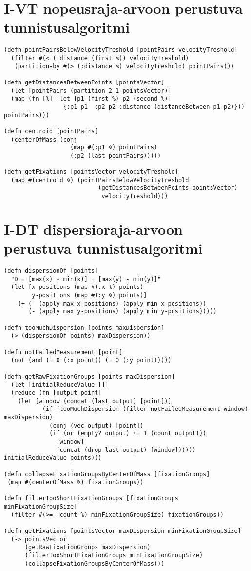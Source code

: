 \section{I-VT nopeusraja-arvoon perustuva tunnistusalgoritmi}
\label{sec:IVT-implementation}

\begin{verbatim}
(defn pointPairsBelowVelocityTreshold [pointPairs velocityTreshold]
  (filter #(< (:distance (first %)) velocityTreshold)
   (partition-by #(> (:distance %) velocityTreshold) pointPairs)))

(defn getDistancesBetweenPoints [pointsVector]
  (let [pointPairs (partition 2 1 pointsVector)]
  (map (fn [%] (let [p1 (first %) p2 (second %)]
                 {:p1 p1  :p2 p2 :distance (distanceBetween p1 p2)})) pointPairs)))

(defn centroid [pointPairs]
  (centerOfMass (conj
                   (map #(:p1 %) pointPairs)
                   (:p2 (last pointPairs)))))

(defn getFixations [pointsVector velocityTreshold]
  (map #(centroid %) (pointPairsBelowVelocityTreshold
                           (getDistancesBetweenPoints pointsVector)
                            velocityTreshold)))
\end{verbatim}

\section{I-DT dispersioraja-arvoon perustuva tunnistusalgoritmi}
\label{sec:IDT-implementation}
\begin{verbatim}
(defn dispersionOf [points]
  "D = [max(x) - min(x)] + [max(y) - min(y)]"
  (let [x-positions (map #(:x %) points)
        y-positions (map #(:y %) points)]
    (+ (- (apply max x-positions) (apply min x-positions))
       (- (apply max y-positions) (apply min y-positions)))))

(defn tooMuchDispersion [points maxDispersion]
  (> (dispersionOf points) maxDispersion))

(defn notFailedMeasurement [point]
  (not (and (= 0 (:x point)) (= 0 (:y point)))))

(defn getRawFixationGroups [points maxDispersion]
  (let [initialReduceValue []]
  (reduce (fn [output point]
    (let [window (concat (last output) [point])]
           (if (tooMuchDispersion (filter notFailedMeasurement window) maxDispersion)
             (conj (vec output) [point])
             (if (or (empty? output) (= 1 (count output)))
               [window]
               (concat (drop-last output) [window]))))) initialReduceValue points)))

(defn collapseFixationGroupsByCenterOfMass [fixationGroups]
 (map #(centerOfMass %) fixationGroups))

(defn filterTooShortFixationGroups [fixationGroups minFixationGroupSize]
  (filter #(>= (count %) minFixationGroupSize) fixationGroups))

(defn getFixations [pointsVector maxDispersion minFixationGroupSize]
  (-> pointsVector
      (getRawFixationGroups maxDispersion)
      (filterTooShortFixationGroups minFixationGroupSize)
      (collapseFixationGroupsByCenterOfMass)))
\end{verbatim}


